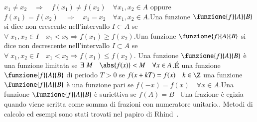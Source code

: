 $x_1\neq x_2\quad\Longrightarrow\quad f(x_1)\neq f(x_2)\quad \forall x_1,x_2\in A $ oppure $f(x_1)= f(x_2)\quad\Longrightarrow\quad x_1= x_2\quad \forall x_1,x_2\in A$.Una funzione $\funzione{f}{A}{B}$ si dice non crescente nell'intervallo $I\subset A$ se $\forall\; x_1,x_2\in I\quad x_1< x_2\Longrightarrow f(x_1)\geq f(x_2)$.Una funzione $\funzione{f}{A}{B}$ si dice non decrescente nell'intervallo $I\subset A$ se $\forall\; x_1,x_2\in I\quad x_1< x_2\Longrightarrow f(x_1)\leq f(x_2)$. Una funzione $\funzione{f}{A}{B}$ è una funzione limitata se $\exists\; M\quad \abs{f(x)}<M \quad\forall x\in A$.\'{E} una funzione $\funzione{f}{A}{B}$ di periodo $T>0$ se $f(x+kT)=f(x)\quad k\in \Z$ una funzione $\funzione{f}{A}{B}$ è una funzione pari se $f(-x)=f(x)\quad\forall x\in A$.Una funzione $\funzione{f}{A}{B}$ è suriettiva se $f(A)=B$\pointsto~
Una frazione è egizia quando viene scritta come somma di frazioni con numeratore unitario.\cite{Boyer1980}. Metodi di calcolo ed esempi sono stati trovati nel papiro di Rhind\pointsto~.
